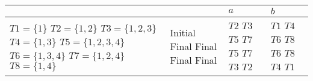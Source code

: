\documentclass{standalone}
\begin{document}
\begin{tabularx}{\textwidth}{XXXX}
        &  & \(a\) & \(b\) \\
        \midrule
            \(T1 = \{1\}\) \newline
            \(T2 = \{1,2\}\) \newline
            \(T3 = \{1,2,3\}\) \newline
            \(T4 = \{1,3\}\) \newline
            \(T5 = \{1,2,3,4\}\) \newline
            \(T6 = \{1,3,4\}\) \newline
            \(T7 = \{1,2,4\}\) \newline
            \(T8 = \{1,4\}\)
            &
            Initial \newline
            \newline
            \newline
            \newline
            Final \newline
            Final \newline
            Final \newline
            Final
            &
            \(T2\) \newline
            \(T3\) \newline
            \(T5\) \newline
            \(T7\) \newline
            \(T5\) \newline
            \(T7\) \newline
            \(T3\) \newline
            \(T2\)
            &
            \(T1\) \newline
            \(T4\) \newline
            \(T6\) \newline
            \(T8\) \newline
            \(T6\) \newline
            \(T8\) \newline
            \(T4\) \newline
            \(T1\)
\end{tabularx}
\end{document}
